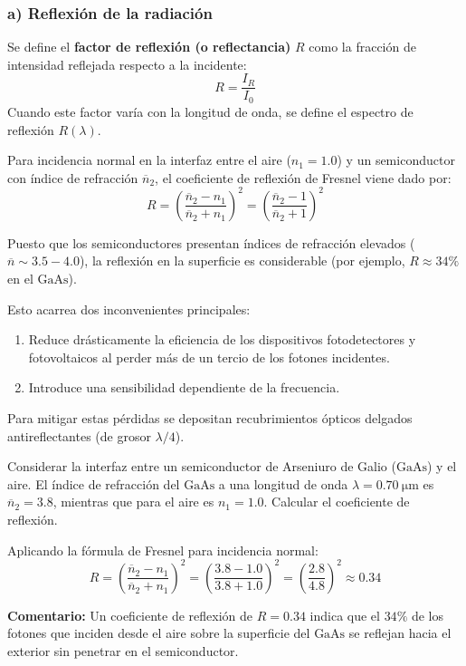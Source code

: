 \subsubsection{a) Reflexión de la radiación}

Se define el \textbf{factor de reflexión (o reflectancia)} $R$ como la fracción de intensidad reflejada respecto a la incidente:
\[
R = \frac{I_R}{I_0}
\]
Cuando este factor varía con la longitud de onda, se define el espectro de reflexión $R(\lambda)$.

Para incidencia normal en la interfaz entre el aire ($n_1 = 1.0$) y un semiconductor con índice de refracción $\overline{n}_2$, el coeficiente de reflexión de Fresnel viene dado por:
\[
R = \left( \frac{\overline{n}_2 - n_1}{\overline{n}_2 + n_1} \right)^2 = \left( \frac{\overline{n}_2 - 1}{\overline{n}_2 + 1} \right)^2
\]

\begin{concepto}
Puesto que los semiconductores presentan índices de refracción elevados ($\overline{n} \sim 3.5 - 4.0$), la reflexión en la superficie es considerable (por ejemplo, $R \approx 34\%$ en el $\text{GaAs}$).

Esto acarrea dos inconvenientes principales:
\begin{enumerate}
    \item Reduce drásticamente la eficiencia de los dispositivos fotodetectores y fotovoltaicos al perder más de un tercio de los fotones incidentes.
    \item Introduce una sensibilidad dependiente de la frecuencia.
\end{enumerate}
Para mitigar estas pérdidas se depositan recubrimientos ópticos delgados antireflectantes (de grosor $\lambda / 4$).
\end{concepto}

\begin{ejemplo}
Considerar la interfaz entre un semiconductor de Arseniuro de Galio ($\text{GaAs}$) y el aire. El índice de refracción del $\text{GaAs}$ a una longitud de onda $\lambda = \SI{0.70}{\micro\meter}$ es $\overline{n}_2 = 3.8$, mientras que para el aire es $n_1 = 1.0$. Calcular el coeficiente de reflexión.

\tcblower

Aplicando la fórmula de Fresnel para incidencia normal:
\[
R = \left( \frac{\overline{n}_2 - n_1}{\overline{n}_2 + n_1} \right)^2 = \left( \frac{3.8 - 1.0}{3.8 + 1.0} \right)^2 = \left( \frac{2.8}{4.8} \right)^2 \approx 0.34
\]

\textbf{Comentario:} Un coeficiente de reflexión de $R = 0.34$ indica que el $34\%$ de los fotones que inciden desde el aire sobre la superficie del $\text{GaAs}$ se reflejan hacia el exterior sin penetrar en el semiconductor.
\end{ejemplo}

